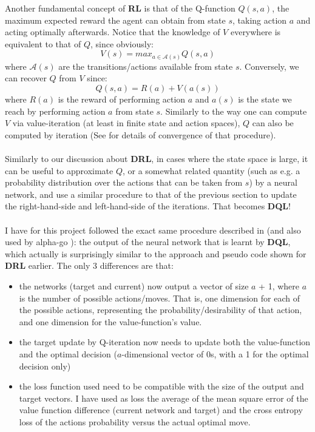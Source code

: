 \label{sec:TheoryDQL}
Another fundamental concept of \textbf{RL} is that of the Q-function $Q(s, a)$, the maximum expected reward the agent can obtain from state $s$, taking action $a$ and acting optimally afterwards. Notice that the knowledge of $V$ everywhere is equivalent to that of $Q$, since obviously:
\begin{equation} \label{eq:QI}
V(s) = max_{a \in \mathcal{A}(s)} Q(s, a)
\end{equation}
where $\mathcal{A}(s)$ are the transitions/actions available from state $s$. Conversely, we can recover $Q$ from $V$ since:
\begin{equation} \label{eq:QI2}
Q(s, a) = R(a) + V(a(s))
\end{equation}
where $R(a)$ is the reward of performing action $a$ and $a(s)$ is the state we reach by performing action $a$ from state $s$. Similarly to the way one can compute $V$ via value-iteration (at least in finite state and action spaces), $Q$ can also be computed by iteration (See \cite{Watkins1992} for details of convergence of that procedure).
\\
\\
Similarly to our discussion about \textbf{DRL}, in cases where the state space is large, it can be useful to approximate $Q$, or a somewhat related quantity (such as e.g. a probability distribution over the actions that can be taken from $s$) by a neural network, and use a similar procedure to that of the previous section to update the right-hand-side and left-hand-side of the iterations. That becomes \textbf{DQL}!
\\
\\
I have for this project followed the exact same procedure described in \cite{https://doi.org/10.48550/arxiv.1805.07470} (and also used by alpha-go \cite{AlphaGo}): the output of the neural network that is learnt by \textbf{DQL}, which actually is surprisingly similar to the approach and pseudo code shown for \textbf{DRL} earlier. The only 3 differences are that:
\begin{itemize}
\item the networks (target and current) now output a vector of size $a$ + 1, where $a$ is the number of possible actions/moves. That is, one dimension for each of the possible actions, representing the probability/desirability of that action, and one dimension for the value-function's value.
\item the target update by Q-iteration now needs to update both the value-function and the optimal decision ($a$-dimensional vector of 0s, with a 1 for the optimal decision only)
\item the loss function used need to be compatible with the size of the output and target vectors. I have used as loss the average of the mean square error of the value function difference (current network and target) and the cross entropy loss of the actions probability versus the actual optimal move.
\end{itemize}
